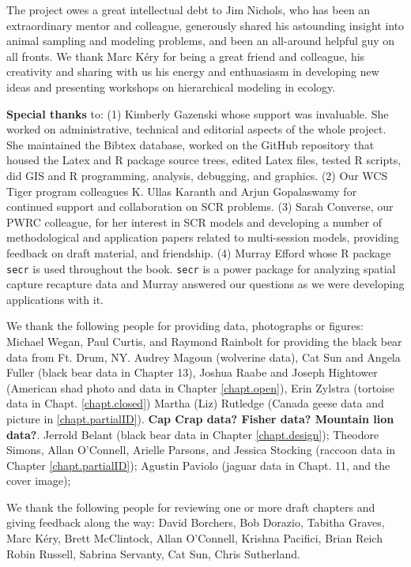 
The project owes a great intellectual debt to Jim Nichols, who has
been an extraordinary mentor and colleague, generously shared his
astounding insight into animal sampling and modeling problems, and
been an all-around helpful guy on all fronts.  We thank Marc K\'{e}ry
for being a great friend and colleague, his creativity and sharing
with us his energy and enthuasiasm in developing new ideas and
presenting workshops on hierarchical modeling in ecology.

{\bf Special thanks} to: (1) Kimberly Gazenski whose support was
invaluable. She worked on administrative, technical and editorial
aspects of the whole project. She maintained the Bibtex database,
worked on the GitHub repository that housed the Latex and R package
source trees, edited Latex files, tested R scripts, did GIS and R
programming, analysis, debugging, and graphics.  (2) Our WCS Tiger
program colleagues K. Ullas Karanth and Arjun Gopalaswamy for
continued support and collaboration on SCR problems.  (3) Sarah
Converse, our PWRC colleague, for her interest in SCR models and
developing a number of methodological and application papers related
to multi-session models, providing feedback on draft material, and
friendship.  (4) Murray Efford whose R package \mbox{\tt secr} is used
throughout the book.  \mbox{\tt secr} is a power package for analyzing
spatial capture recapture data and Murray answered our questions as we
were developing applications with it.


We thank the following people for providing data, photographs or figures:
Michael Wegan, Paul Curtis, and Raymond Rainbolt for providing the black bear data from Ft. Drum, NY. 
Audrey Magoun (wolverine data), Cat Sun and Angela Fuller (black bear
data in Chapter 13), Joshua Raabe and Joseph Hightower (American shad
photo and data in Chapter \ref{chapt.open}), Erin Zylstra (tortoise
data in Chapt. \ref{chapt.closed}) Martha (Liz) Rutledge (Canada geese
data and picture in \ref{chapt.partialID}).  {\bf Cap Crap data?
  Fisher data?  Mountain lion data?}.  Jerrold Belant (black bear data
in Chapter \ref{chapt.design}); Theodore Simons, Allan O'Connell,
Arielle Parsons, and Jessica Stocking (raccoon data in Chapter
\ref{chapt.partialID}); Agustin Paviolo (jaguar data in Chapt. 11, and
the cover image);

We thank the following people for reviewing one or more draft chapters
and giving feedback along the way:
David Borchers,
Bob Dorazio,
Tabitha Graves,
Marc K\'{e}ry, 
Brett McClintock,
Allan O'Connell,
Krishna Pacifici,
Brian Reich
Robin Russell,
Sabrina Servanty,
Cat Sun,
Chris Sutherland.

